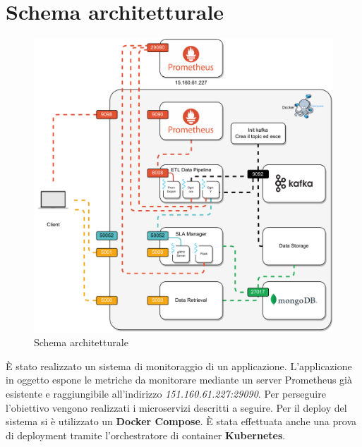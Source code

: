 \documentclass{article}
\begin{document}
\section{Schema architetturale}
    \begin{figure}[h]
        \centering
        \includegraphics[width=\textwidth]{img/Architettura.pdf}
        \caption{Schema architetturale}
        \label{fig:my_label}
    \end{figure}
    È stato realizzato un sistema di monitoraggio di un applicazione. L'applicazione in oggetto espone le metriche da monitorare mediante un server Prometheus già esistente e raggiungibile all'indirizzo \textit{151.160.61.227:29090}. Per perseguire l'obiettivo vengono realizzati i microservizi descritti a seguire. Per il deploy del sistema si è utilizzato un \textbf{Docker Compose}. È stata effettuata anche una prova di deployment tramite l'orchestratore di container \textbf{Kubernetes}.
\end{document}
